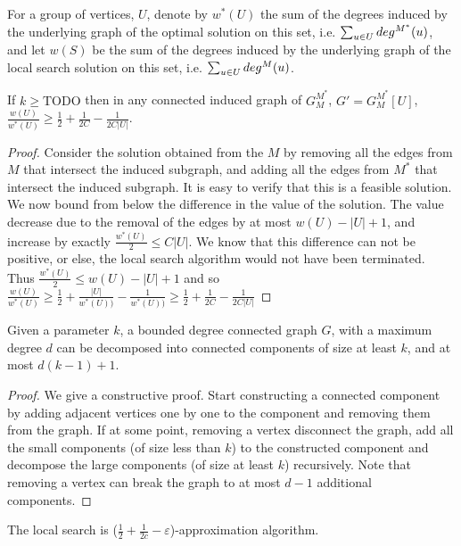 For a group of vertices, $U$, denote by $w^*(U)$ the sum of the degrees 
induced by the underlying graph of the optimal solution on this set, i.e.
$\sum_{u \in U} \dinout[M^*](u)$, 
and let $w(S)$ be the sum of the degrees 
induced by the underlying graph of the local search solution on this set, i.e.
$\sum_{u \in U} \dinout(u)$.

\begin{lemma}
\label{lemma:r}
If $k \geq \text{TODO}$ then in any connected induced graph of $G^{M^*}_M$, 
$G'= G^{M^*}_M[U]$, 
$
\frac{w(U)}{w^*(U)} 
\geq \frac{1}{2} + \frac{1}{2C} - \frac{1}{2C|U|}
$.
\end{lemma}

\begin{proof}
Consider the solution obtained from the $M$ by removing all the edges from $M$
that intersect the induced subgraph, and adding all the edges from $M^*$ that
intersect the induced subgraph.
It is easy to verify that this is a feasible solution.
We now bound from below the difference in the value of the solution.
The value decrease due to the removal of the edges by at most $w(U) - |U| + 1$,
and increase by exactly $\frac{w^*(U)}{2} \leq C |U|$.
We know that this difference can not be positive, or else, the local search
algorithm would not have been terminated.
Thus 
$\frac{w^*(U)}{2} \leq w(U) - |U| + 1$ 
and so
$
\frac{w(U)}{w^*(U)} 
\geq 
\frac{1}{2} + \frac{|U|}{w^*(U))} - \frac{1}{w^*(U))}  
\geq
\frac{1}{2} + \frac{1}{2C} - \frac{1}{2C|U|}
$
\end{proof}


\begin{lemma}
\label{lemma:dec}
Given a parameter $k$, a bounded degree connected graph $G$, with a maximum
degree $d$ can be decomposed into connected components of size at least $k$, and at most
$d(k-1) + 1$.
\end{lemma}

\begin{proof}
We give a constructive proof.
Start constructing a connected component by adding adjacent vertices
one by one to the component and removing them from the graph.
If at some point, removing a vertex disconnect the graph, add all the small
components (of size less than $k$) to the constructed component and decompose
the large components (of size at least $k$) recursively.
Note that removing a vertex can break the graph to at most $d - 1$ additional
components.
\end{proof}

\begin{theorem}
\label{theorem:local search}
The local search is ($\frac{1}{2} + \frac{1}{2c} - \varepsilon$)-approximation
algorithm.
\end{theorem}

